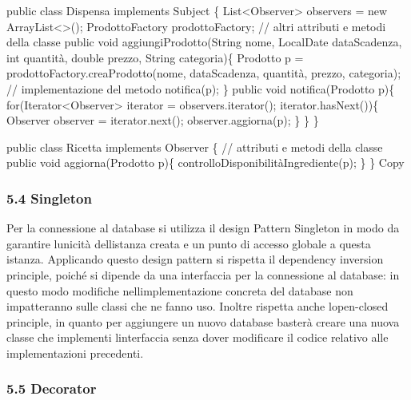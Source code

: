 \documentclass[
]{article}
\newenvironment{Shaded}{}{}
\newcommand{\NormalTok}[1]{#1}
\begin{document}
\begin{Shaded}
\begin{Highlighting}[]
\NormalTok{public class Dispensa implements Subject \{}
\NormalTok{    List\textless{}Observer\textgreater{} observers = new ArrayList\textless{}\textgreater{}();}
\NormalTok{    ProdottoFactory prodottoFactory;}
\NormalTok{    // altri attributi e metodi della classe}
\NormalTok{    public void aggiungiProdotto(String nome, LocalDate dataScadenza, int quantità, double prezzo, String categoria)\{}
\NormalTok{        Prodotto p = prodottoFactory.creaProdotto(nome, dataScadenza, quantità, prezzo, categoria);}
\NormalTok{        // implementazione del metodo}
\NormalTok{        notifica(p);}
\NormalTok{    \}}
\NormalTok{    public void notifica(Prodotto p)\{}
\NormalTok{        for(Iterator\textless{}Observer\textgreater{} iterator = observers.iterator(); iterator.hasNext())\{}
\NormalTok{            Observer observer = iterator.next();}
\NormalTok{            observer.aggiorna(p);}
\NormalTok{        \}}
\NormalTok{    \}}
\NormalTok{\}}

\NormalTok{public class Ricetta implements Observer \{}
\NormalTok{    // attributi e metodi della classe}
\NormalTok{    public void aggiorna(Prodotto p)\{}
\NormalTok{        controlloDisponibilitàIngrediente(p);}
\NormalTok{    \}}
\NormalTok{\}}
\NormalTok{Copy}
\end{Highlighting}
\end{Shaded}

\subsubsection{5.4 Singleton}\label{singleton}

Per la connessione al database si utilizza il design Pattern Singleton
in modo da garantire l\textquotesingle unicità
dell\textquotesingle istanza creata e un punto di accesso globale a
questa istanza. Applicando questo design pattern si rispetta il
dependency inversion principle, poiché si dipende da una interfaccia per
la connessione al database: in questo modo modifiche
nell\textquotesingle implementazione concreta del database non
impatteranno sulle classi che ne fanno uso. Inoltre rispetta anche
l\textquotesingle open-closed principle, in quanto per aggiungere un
nuovo database basterà creare una nuova classe che implementi
l\textquotesingle interfaccia senza dover modificare il codice relativo
alle implementazioni precedenti.

\subsubsection{5.5 Decorator}\label{decorator}
\end{document}
